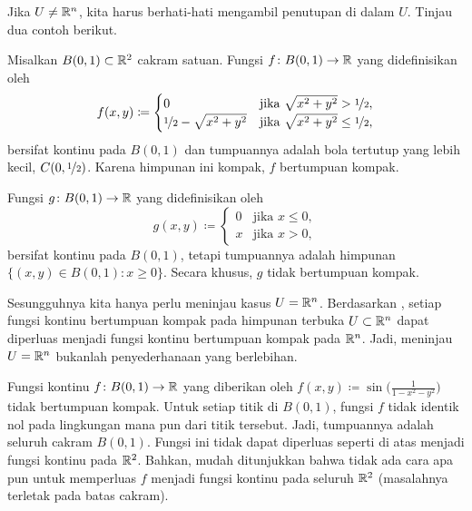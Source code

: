Jika $U \neq {\mathbb{R}}^n$, kita harus berhati-hati mengambil penutupan di dalam $U$.
Tinjau dua contoh berikut.

\begin{example}
Misalkan $B(0,1) \subset {\mathbb{R}}^2$ cakram satuan. Fungsi
$f \colon B(0,1) \to {\mathbb{R}}$ yang didefinisikan oleh
\begin{equation*}
f(x,y) \coloneqq
\begin{cases}
0                                & \text{jika } \sqrt{x^2+y^2} > \nicefrac{1}{2}, \\
\nicefrac{1}{2} - \sqrt{x^2+y^2} & \text{jika } \sqrt{x^2+y^2} \leq \nicefrac{1}{2},
\end{cases}
\end{equation*}
bersifat kontinu pada $B(0,1)$ dan tumpuannya adalah bola tertutup yang lebih
kecil, $C(0,\nicefrac{1}{2})$. Karena himpunan ini kompak, $f$ bertumpuan
kompak.

Fungsi $g \colon B(0,1) \to {\mathbb{R}}$ yang didefinisikan oleh
\begin{equation*}
g(x,y) \coloneqq
\begin{cases}
0 & \text{jika } x \leq 0, \\
x & \text{jika } x > 0,
\end{cases}
\end{equation*}
bersifat kontinu pada $B(0,1)$, tetapi tumpuannya adalah himpunan
$\bigl\{ (x,y) \in B(0,1) : x \geq 0 \bigr\}$. Secara khusus, $g$ tidak
bertumpuan kompak.
\end{example}

Sesungguhnya kita hanya perlu meninjau kasus $U={\mathbb{R}}^n$. Berdasarkan
, setiap fungsi kontinu bertumpuan
kompak pada himpunan terbuka $U \subset {\mathbb{R}}^n$ dapat diperluas menjadi fungsi
kontinu bertumpuan kompak pada ${\mathbb{R}}^n$. Jadi, meninjau $U={\mathbb{R}}^n$ bukanlah
penyederhanaan yang berlebihan.

\begin{example}
Fungsi kontinu $f \colon B(0,1) \to {\mathbb{R}}$ yang diberikan oleh
$f(x,y) \coloneqq \sin\bigl(\frac{1}{1-x^2-y^2}\bigr)$
tidak bertumpuan kompak. Untuk setiap titik di $B(0,1)$, fungsi $f$ tidak
identik nol pada lingkungan mana pun dari titik tersebut. Jadi, tumpuannya
adalah seluruh cakram $B(0,1)$.
Fungsi ini tidak dapat diperluas seperti di atas menjadi fungsi kontinu pada
${\mathbb{R}}^2$. Bahkan, mudah ditunjukkan bahwa tidak ada cara apa pun untuk memperluas
$f$ menjadi fungsi kontinu pada seluruh ${\mathbb{R}}^2$ (masalahnya terletak pada batas
cakram).
\end{example}

